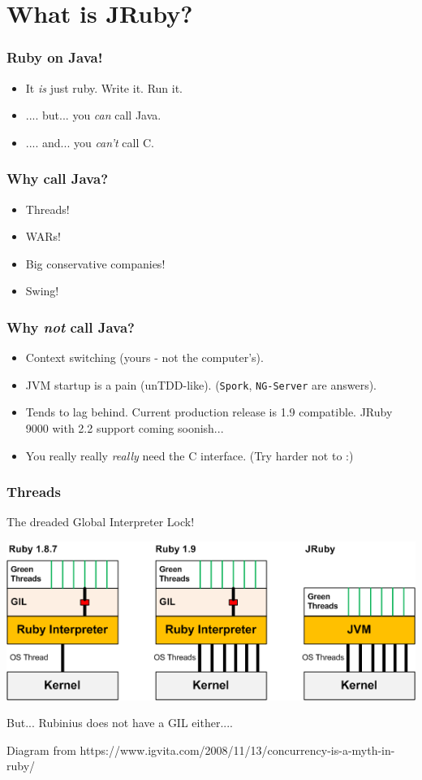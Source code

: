 



\begin{frame}
  \titlepage
\end{frame}

\section{What is JRuby?}
\begin{frame}\frametitle{Ruby on Java!}
\begin{itemize}
  \item It \emph{is} just ruby. Write it. Run it.
  \item .... but... you \emph{can} call Java.
  \item .... and... you \emph{can't} call C.
\end{itemize}
\end{frame}
\begin{frame}\frametitle{Why call Java?}
  \begin{itemize}
    \item Threads!
    \item WARs!
    \item Big conservative companies!
    \item Swing!
  \end{itemize}
\end{frame}
\begin{frame}\frametitle{Why \emph{not} call Java?}
  \begin{itemize}
    \item Context switching (yours - not the computer's).
    \item JVM startup is a pain (unTDD-like). (\texttt{Spork}, \texttt{NG-Server} are answers).
    \item Tends to lag behind. Current production release is 1.9 compatible. JRuby 9000 with 2.2 support coming soonish...
    \item You really really \emph{really} need the C interface. (Try harder not to :)
  \end{itemize}
\end{frame}
\begin{frame}\frametitle{Threads}
  The dreaded Global Interpreter Lock!
  \begin{center}
  \includegraphics[scale=.5]{diagrams/ruby-gil.png}
  \end{center}
  But... Rubinius does not have a GIL either....


{\tiny Diagram from https://www.igvita.com/2008/11/13/concurrency-is-a-myth-in-ruby/}
\end{frame}
